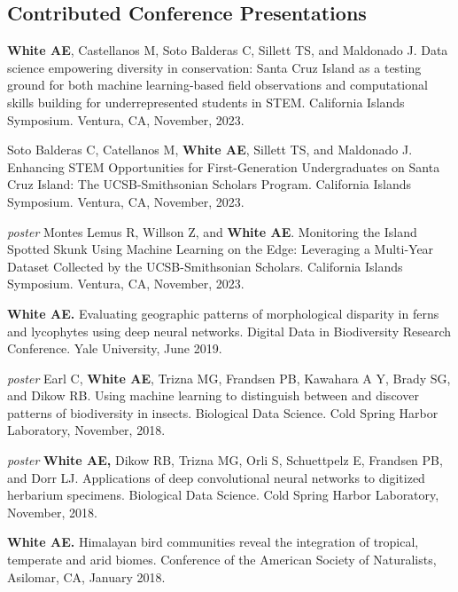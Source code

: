 \documentclass[letterpaper]{article}
\newenvironment{biblist}{%
   \begin{list}{}{%
     \setlength{\labelwidth}{0pt}%
     \setlength{\labelsep}{1em}%
     \setlength{\leftmargin}{2em}%
     \setlength{\itemindent}{-1em}%
   }
}{\end{list}}
\begin{document}
\subsection*{Contributed Conference Presentations}
\begin{biblist}
\item \textbf{White AE}, Castellanos M, Soto Balderas C, Sillett TS, and Maldonado J. Data science empowering diversity in conservation: Santa Cruz Island as a testing ground for both machine learning-based field observations and computational skills building for underrepresented students in STEM. California Islands Symposium. Ventura, CA, November, 2023.

\item Soto Balderas C, Catellanos M, \textbf{White AE}, Sillett TS, and Maldonado J. Enhancing STEM Opportunities for First-Generation Undergraduates on Santa Cruz Island: The UCSB-Smithsonian Scholars Program. California Islands Symposium. Ventura, CA, November, 2023.

\item \emph{poster} Montes Lemus R, Willson Z, and \textbf{White AE}. Monitoring the Island Spotted Skunk Using Machine Learning on the Edge: Leveraging a Multi-Year Dataset Collected by the UCSB-Smithsonian Scholars. California Islands Symposium. Ventura, CA, November, 2023.

\item \textbf{White AE.} Evaluating geographic patterns of morphological disparity in ferns and lycophytes using deep neural networks. Digital Data in Biodiversity Research Conference. Yale University, June 2019.

\item \emph{poster} Earl C, \textbf{White AE}, Trizna MG, Frandsen PB, Kawahara A Y, Brady SG, and Dikow RB. Using machine learning to distinguish between and discover patterns of biodiversity in insects. Biological Data Science. Cold Spring Harbor Laboratory, November, 2018.

\item \emph{poster} \textbf{White AE,} Dikow RB, Trizna MG, Orli S, Schuettpelz E, Frandsen PB, and Dorr LJ. Applications of deep convolutional neural networks to digitized herbarium specimens. Biological Data Science. Cold Spring Harbor Laboratory, November, 2018.

\item \textbf{White AE.} Himalayan bird communities reveal the integration of tropical, temperate and arid biomes. Conference of the American Society of Naturalists, Asilomar, CA, January 2018.


\end{biblist}
\end{document}
